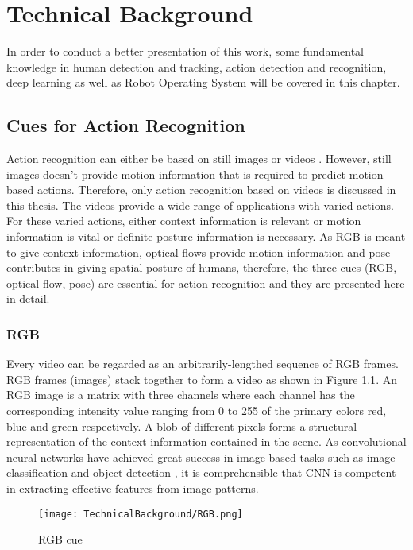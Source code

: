 
\chapter{Technical Background}
\label{sec:technical_background}

In order to conduct a better presentation of this work, some fundamental knowledge in human detection and tracking, action detection and recognition, deep learning as well as Robot Operating System will be covered in this chapter. 

\section{Cues for Action Recognition}
Action recognition can either be based on still images \cite{zhang_arimage_2016} or videos \cite{TSN2016ECCV}. However, still images doesn’t provide motion information that is required to predict motion-based actions. Therefore, only action recognition based on videos is discussed in this thesis. The videos provide a wide range of applications with varied actions. For these varied actions, either context information is relevant or motion information is vital or definite posture information is necessary. As RGB is meant to give context information, optical flows provide motion information and pose contributes in giving spatial posture of humans, therefore, the three cues (RGB, optical flow, pose) are essential for action recognition and they are presented here in detail.

\subsection{RGB}
Every video can be regarded as an arbitrarily-lengthed sequence of RGB frames. RGB frames (images) stack together to form a video as shown in Figure \ref{fig:rgb_cue}. An RGB image is a matrix with three channels where each channel has the corresponding intensity value ranging from 0 to 255 of the primary colors red, blue and green respectively. A blob of different pixels forms a structural representation of the context information contained in the scene. As convolutional neural networks have achieved great success in image-based tasks such as image classification and object detection \cite{zhao2018object}, it is comprehensible that CNN is competent in extracting effective features from image patterns.

\begin{figure}[h!]
  \centering
  \texttt{[image: TechnicalBackground/RGB.png]}
  \caption{RGB cue}
  \label{fig:rgb_cue}
\end{figure}

